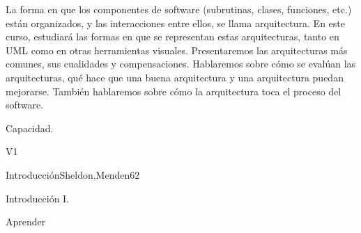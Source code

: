 
\begin{syllabus}


\begin{justification}
 La forma en que los componentes de software (subrutinas, clases, funciones, etc.) están organizados, y las interacciones entre ellos, se llama arquitectura. En este curso, estudiará las formas en que se representan estas arquitecturas, tanto en UML como en otras herramientas visuales. Presentaremos las arquitecturas más comunes, sus cualidades y compensaciones. Hablaremos sobre cómo se evalúan las arquitecturas, qué hace que una buena arquitectura y una arquitectura puedan mejorarse. También hablaremos sobre cómo la arquitectura toca el proceso del software.
   \end{justification}
   
   \begin{goals}
   \item Capacidad.
   \end{goals}
   
   \begin{outcomes}{V1}
      \item {}
   \end{outcomes}
   
   \begin{unit}{Introducción}{}{Sheldon,Menden}{6}{2}
   \begin{topics}
         \item Introducción I.
      \end{topics}
   
      \begin{learningoutcomes}
         \item Aprender
      \end{learningoutcomes}
   \end{unit}
   
   
   
   
   
   
   \begin{coursebibliography}
   \end{coursebibliography}
   
   \end{syllabus}
   
